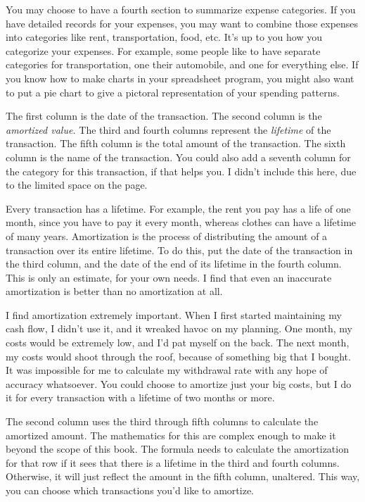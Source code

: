 You may choose to have a fourth section to summarize expense categories. If you have detailed records for your expenses, you may want to combine those expenses into categories like rent, transportation, food, etc. It's up to you how you categorize your expenses. For example, some people like to have separate categories for transportation, one their automobile, and one for everything else. If you know how to make charts in your spreadsheet program, you might also want to put a pie chart to give a pictoral representation of your spending patterns.

The first column is the date of the transaction. The second column is the \emph{amortized value.} The third and fourth columns represent the \emph{lifetime} of the transaction. The fifth column is the total amount of the transaction. The sixth column is the name of the transaction. You could also add a seventh column for the category for this transaction, if that helps you. I didn't include this here, due to the limited space on the page.

Every transaction has a lifetime. For example, the rent you pay has a life of one month, since you have to pay it every month, whereas clothes can have a lifetime of many years. Amortization is the process of distributing the amount of a transaction over its entire lifetime. To do this, put the date of the transaction in the third column, and the date of the end of its lifetime in the fourth column. This is only an estimate, for your own needs. I find that even an inaccurate amortization is better than no amortization at all.

I find amortization extremely important. When I first started maintaining my cash flow, I didn't use it, and it wreaked havoc on my planning. One month, my costs would be extremely low, and I'd pat myself on the back. The next month, my costs would shoot through the roof, because of something big that I bought. It was impossible for me to calculate my withdrawal rate with any hope of accuracy whatsoever. You could choose to amortize just your big costs, but I do it for every transaction with a lifetime of two months or more.

The second column uses the third through fifth columns to calculate the amortized amount. The mathematics for this are complex enough to make it beyond the scope of this book. The formula needs to calculate the amortization for that row if it sees that there is a lifetime in the third and fourth columns. Otherwise, it will just reflect the amount in the fifth column, unaltered. This way, you can choose which transactions you'd like to amortize.

